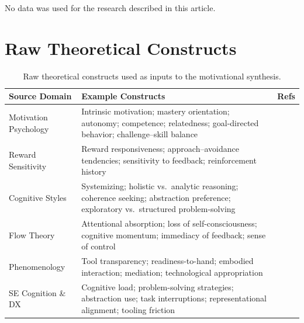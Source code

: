 \documentclass[12pt]{elsarticle}
\begin{document}
No data was used for the research described in this article.



\appendix

\section{Raw Theoretical Constructs}
\label{app:constructs}

\begin{table}[htbp]
\caption{Raw theoretical constructs used as inputs to the motivational 
synthesis.}
\label{tab:constructs}
\centering
\begin{tabularx}{\linewidth}{lXl}
\toprule
\textbf{Source Domain} & \textbf{Example Constructs} & \textbf{Refs} \\
\midrule
Motivation Psychology & 
    Intrinsic motivation; mastery orientation; autonomy; competence; 
    relatedness; goal-directed behavior; challenge--skill balance & 
    \cite{ryan2000,csikszentmihalyi1990} \\
\addlinespace
Reward Sensitivity & 
    Reward responsiveness; approach--avoidance tendencies; 
    sensitivity to feedback; reinforcement history & 
    \cite{gray1987,corr2004} \\
\addlinespace
Cognitive Styles & 
    Systemizing; holistic vs.\ analytic reasoning; coherence seeking; 
    abstraction preference; exploratory vs.\ structured 
    problem-solving & 
    \cite{messick1976,kirton1984} \\
\addlinespace
Flow Theory & 
    Attentional absorption; loss of self-consciousness; cognitive 
    momentum; immediacy of feedback; sense of control & 
    \cite{csikszentmihalyi1990,nakamura2009} \\
\addlinespace
Phenomenology & 
    Tool transparency; readiness-to-hand; embodied interaction; 
    mediation; technological appropriation & 
    \cite{heidegger1962,ihde1990} \\
\addlinespace
SE Cognition \& DX & 
    Cognitive load; problem-solving strategies; abstraction use; 
    task interruptions; representational alignment; tooling friction & 
    \cite{green1996,parnin2011,kramer2007} \\
\bottomrule
\end{tabularx}
\end{table}
\end{document}
